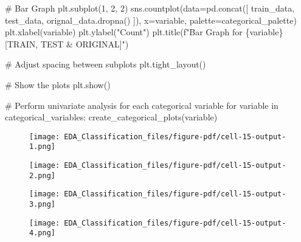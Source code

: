\documentclass[
  letterpaper,
  DIV=11,
  numbers=noendperiod]{scrartcl}
\newenvironment{Shaded}{\begin{snugshade}}{\end{snugshade}}
\newcommand{\CommentTok}[1]{\textcolor[rgb]{0.37,0.37,0.37}{#1}}
\newcommand{\ControlFlowTok}[1]{\textcolor[rgb]{0.00,0.23,0.31}{#1}}
\newcommand{\DecValTok}[1]{\textcolor[rgb]{0.68,0.00,0.00}{#1}}
\newcommand{\KeywordTok}[1]{\textcolor[rgb]{0.00,0.23,0.31}{#1}}
\newcommand{\NormalTok}[1]{\textcolor[rgb]{0.00,0.23,0.31}{#1}}
\newcommand{\OperatorTok}[1]{\textcolor[rgb]{0.37,0.37,0.37}{#1}}
\newcommand{\SpecialCharTok}[1]{\textcolor[rgb]{0.37,0.37,0.37}{#1}}
\newcommand{\SpecialStringTok}[1]{\textcolor[rgb]{0.13,0.47,0.30}{#1}}
\newcommand{\StringTok}[1]{\textcolor[rgb]{0.13,0.47,0.30}{#1}}
\begin{document}
\begin{Shaded}
\begin{Highlighting}[]
    \CommentTok{\# Bar Graph}
\NormalTok{    plt.subplot(}\DecValTok{1}\NormalTok{, }\DecValTok{2}\NormalTok{, }\DecValTok{2}\NormalTok{)}
\NormalTok{    sns.countplot(data}\OperatorTok{=}\NormalTok{pd.concat([}
\NormalTok{        train\_data, test\_data, orignal\_data.dropna()}
\NormalTok{    ]), x}\OperatorTok{=}\NormalTok{variable, palette}\OperatorTok{=}\NormalTok{categorical\_palette)}
\NormalTok{    plt.xlabel(variable)}
\NormalTok{    plt.ylabel(}\StringTok{"Count"}\NormalTok{)}
\NormalTok{    plt.title(}\SpecialStringTok{f"Bar Graph for }\SpecialCharTok{\{}\NormalTok{variable}\SpecialCharTok{\}}\SpecialStringTok{ [TRAIN, TEST \& ORIGINAL]"}\NormalTok{)}

    \CommentTok{\# Adjust spacing between subplots}
\NormalTok{    plt.tight\_layout()}

    \CommentTok{\# Show the plots}
\NormalTok{    plt.show()}

\CommentTok{\# Perform univariate analysis for each categorical variable}
\ControlFlowTok{for}\NormalTok{ variable }\KeywordTok{in}\NormalTok{ categorical\_variables:}
\NormalTok{    create\_categorical\_plots(variable)}
\end{Highlighting}
\end{Shaded}

\begin{figure}[H]

{\centering \texttt{[image: EDA\_Classification\_files/figure-pdf/cell-15-output-1.png]}

}

\end{figure}

\begin{figure}[H]

{\centering \texttt{[image: EDA\_Classification\_files/figure-pdf/cell-15-output-2.png]}

}

\end{figure}

\begin{figure}[H]

{\centering \texttt{[image: EDA\_Classification\_files/figure-pdf/cell-15-output-3.png]}

}

\end{figure}

\begin{figure}[H]

{\centering \texttt{[image: EDA\_Classification\_files/figure-pdf/cell-15-output-4.png]}

}

\end{figure}
\end{document}
